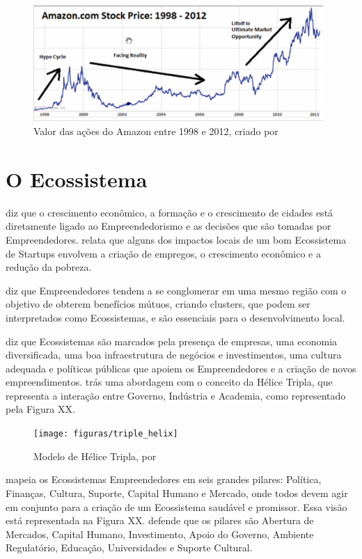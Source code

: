 \begin{figure}[!htb]
\centering
\includegraphics[width=11cm,angle=0]{figuras/stock_market_amazon}
\caption{Valor das ações do Amazon entre 1998 e 2012, criado por \cite{Pepper2012}}
\label{Rotulo}
\end{figure}

\section{O Ecossistema}
\label{section:ecossistemas_e_suas_pecas}

 diz que o crescimento econômico, a formação e o crescimento de cidades está diretamente ligado ao Empreendedorismo e as decisões que são tomadas por Empreendedores.  relata que alguns dos impactos locais de um bom Ecossistema de Startups envolvem a criação de empregos, o crescimento econômico e a redução da pobreza. 

 diz que Empreendedores tendem a se conglomerar em uma mesmo região com o objetivo de obterem benefícios mútuos, criando clusters, que podem ser interpretados como Ecossistemas, e são essenciais para o desenvolvimento local.

 diz que Ecossistemas são marcados pela presença de empresas, uma economia diversificada, uma boa infraestrutura de negócios e investimentos, uma cultura adequada e políticas públicas que apoiem os Empreendedores e a criação de novos empreendimentos.  trás uma abordagem com o conceito da Hélice Tripla, que representa a interação entre Governo, Indústria e Academia, como representado pela Figura XX. 

\begin{figure}[!htb]
\centering
\texttt{[image: figuras/triple\_helix]}
\caption{Modelo de Hélice Tripla, por }
\label{figure:triple_helix}
\end{figure}

 mapeia os Ecossistemas Empreendedores em seis grandes pilares: Política, Finanças, Cultura, Suporte, Capital Humano e Mercado, onde todos devem agir em conjunto para a criação de um Ecossistema saudável e promissor. Essa visão está representada na Figura XX.  defende que os pilares são Abertura de Mercados, Capital Humano, Investimento, Apoio do Governo, Ambiente Regulatório, Educação, Universidades e Suporte Cultural.

